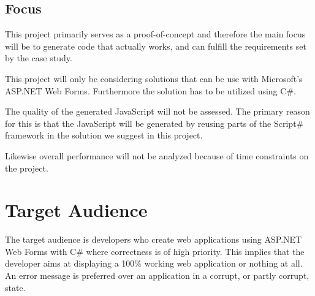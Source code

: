 

	\subsection{Focus} %
	\label{sub:focus}
		This project primarily serves as a proof-of-concept and therefore the main focus will be to generate code that actually works, and can fulfill the requirements set by the case study. 

		This project will only be considering solutions that can be use with Microsoft’s ASP.NET Web Forms. Furthermore the solution has to be utilized using C\#.

		The quality of the generated JavaScript will not be assessed. The primary reason for this is that the JavaScript will be generated by reusing parts of the Script\# framework in the solution we suggest in this project.

		Likewise overall performance will not be analyzed because of time constraints on the project.


\section{Target Audience} %
\label{sec:section_name}
	The target audience is developers who create web applications using ASP.NET Web Forms with C\# where correctness is of high priority. This implies that the developer aims at displaying a 100\% working web application or nothing at all. An error message is preferred over an application in a corrupt, or partly corrupt, state.






